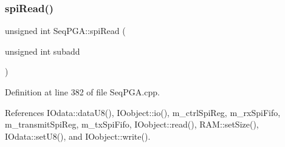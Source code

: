 \mbox{\label{classSeqPGA_a654a40dc597227e59458631f49ff598f}} 
\subsubsection{\texorpdfstring{spi\+Read()}{spiRead()}\hspace{0.1cm}{\footnotesize\ttfamily [3/3]}}
{\footnotesize\ttfamily unsigned int Seq\+P\+G\+A\+::spi\+Read (\begin{DoxyParamCaption}\item[{unsigned int}]{subadd }\end{DoxyParamCaption})}



Definition at line 382 of file Seq\+P\+G\+A.\+cpp.



References I\+Odata\+::data\+U8(), I\+Oobject\+::io(), m\+\_\+ctrl\+Spi\+Reg, m\+\_\+rx\+Spi\+Fifo, m\+\_\+transmit\+Spi\+Reg, m\+\_\+tx\+Spi\+Fifo, I\+Oobject\+::read(), R\+A\+M\+::set\+Size(), I\+Odata\+::set\+U8(), and I\+Oobject\+::write().


